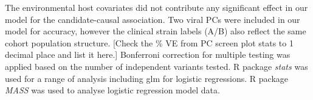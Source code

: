 \documentclass{article}
\begin{document}










The environmental host covariates did not contribute any significant effect in our model for the candidate-causal association.
Two viral PCs were included in our model for accuracy, however the clinical 
strain labels (A/B) also reflect the same cohort population structure.
[Check the \% VE from PC screen plot stats to 1 decimal place and list it here.]
Bonferroni correction for multiple testing was applied based on the number of independent variants tested.
R package \textit{stats} was used for a range of analysis including glm for logistic regressions. 
R package \textit{MASS} was used to analyse logistic regression model data.
\end{document}
